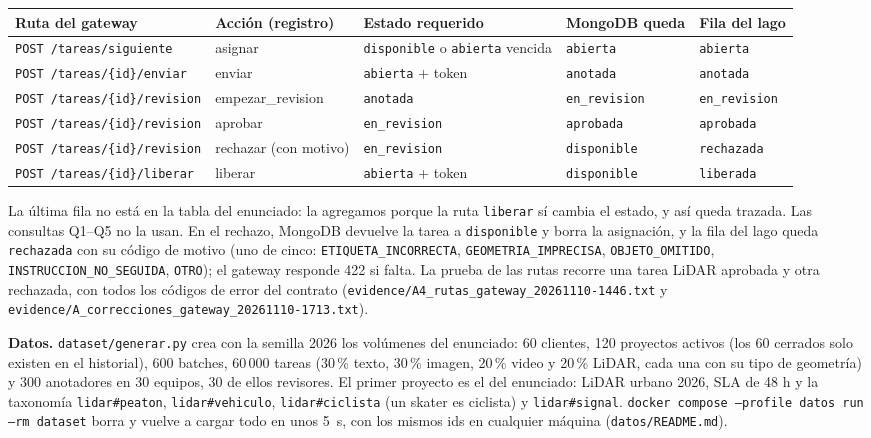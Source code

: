 \documentclass[10pt,letterpaper]{article}
\newcommand{\ev}[1]{{\footnotesize\texttt{evidence/\allowbreak #1}}}
\begin{document}
\begin{center}\footnotesize
\begin{tabular}{@{}lllll@{}}
\toprule
Ruta del gateway & Acción (registro) & Estado requerido & MongoDB queda & Fila del lago \\
\midrule
\texttt{POST /tareas/siguiente} & asignar & \texttt{disponible} o \texttt{abierta} vencida & \texttt{abierta} & \texttt{abierta} \\
\texttt{POST /tareas/\{id\}/enviar} & enviar & \texttt{abierta} + token & \texttt{anotada} & \texttt{anotada} \\
\texttt{POST /tareas/\{id\}/revision} & empezar\_revision & \texttt{anotada} & \texttt{en\_revision} & \texttt{en\_revision} \\
\texttt{POST /tareas/\{id\}/revision} & aprobar & \texttt{en\_revision} & \texttt{aprobada} & \texttt{aprobada} \\
\texttt{POST /tareas/\{id\}/revision} & rechazar (con motivo) & \texttt{en\_revision} & \texttt{disponible} & \texttt{rechazada} \\
\texttt{POST /tareas/\{id\}/liberar} & liberar & \texttt{abierta} + token & \texttt{disponible} & \texttt{liberada} \\
\bottomrule
\end{tabular}
\end{center}

La última fila no está en la tabla del enunciado: la agregamos porque la ruta \texttt{liberar} sí cambia el
estado, y así queda trazada. Las consultas Q1--Q5 no la usan. En el rechazo, MongoDB devuelve la tarea a
\texttt{disponible} y borra la asignación, y la fila del lago queda \texttt{rechazada} con su código de
motivo (uno de cinco: \texttt{ETIQUETA\_INCORRECTA}, \texttt{GEOMETRIA\_IMPRECISA},
\texttt{OBJETO\_OMITIDO}, \texttt{INSTRUCCION\_NO\_SEGUIDA}, \texttt{OTRO}); el gateway responde 422 si
falta. La prueba de las rutas recorre una tarea LiDAR aprobada y otra rechazada, con todos los códigos de
error del contrato (\ev{A4\_rutas\_gateway\_20261110-1446.txt} y
\ev{A\_correcciones\_gateway\_20261110-1713.txt}).

\textbf{Datos.} \texttt{dataset/generar.py} crea con la semilla 2026 los volúmenes del enunciado: 60
clientes, 120 proyectos activos (los 60 cerrados solo existen en el historial), 600 batches, 60\,000 tareas
(30\,\% texto, 30\,\% imagen, 20\,\% video y 20\,\% LiDAR, cada una con su tipo de geometría) y 300
anotadores en 30 equipos, 30 de ellos revisores. El primer proyecto es el del enunciado: LiDAR urbano 2026,
SLA de 48 h y la taxonomía \texttt{lidar\#peaton}, \texttt{lidar\#vehiculo}, \texttt{lidar\#ciclista} (un
skater es ciclista) y \texttt{lidar\#signal}. \texttt{docker compose --profile datos run --rm dataset}
borra y vuelve a cargar todo en unos 5~s, con los mismos ids en cualquier máquina (\texttt{datos/README.md}).
\end{document}
